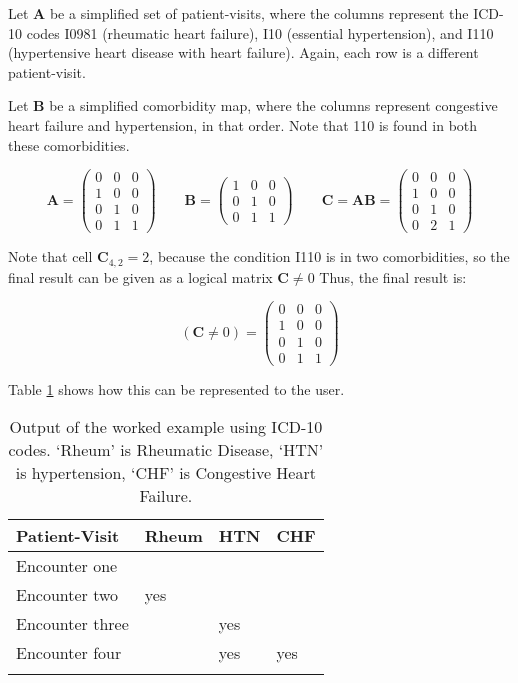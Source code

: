 \documentclass[article]{jss}
\begin{document}
Let \(\boldsymbol{A}\) be a simplified set of patient-visits, where the
columns represent the ICD-10 codes I0981 (rheumatic heart failure), I10
(essential hypertension), and I110 (hypertensive heart disease with
heart failure). Again, each row is a different patient-visit.

Let \(\boldsymbol{B}\) be a simplified comorbidity map, where the
columns represent congestive heart failure and hypertension, in that
order. Note that 110 is found in both these comorbidities.

\[\boldsymbol{A} =
\begin{pmatrix}
0 & 0 & 0 \\
1 & 0 & 0 \\
0 & 1 & 0 \\
0 & 1 & 1
\end{pmatrix}
\qquad
\boldsymbol{B} =
\begin{pmatrix}
1 & 0 & 0 \\
0 & 1 & 0 \\
0 & 1 & 1
\end{pmatrix}
\qquad
\boldsymbol{C} = \boldsymbol{A}\boldsymbol{B} =
\begin{pmatrix}
0 & 0 & 0 \\
1 & 0 & 0 \\
0 & 1 & 0 \\
0 & 2 & 1
\end{pmatrix}\]\label{eq:ABC}

Note that cell \(\boldsymbol{C}_{4,2} = 2\), because the condition I110
is in two comorbidities, so the final result can be given as a logical
matrix \(\boldsymbol{C} \neq 0\) Thus, the final result is:

\[(\boldsymbol{C} \neq 0) =
\begin{pmatrix}
0 & 0 & 0 \\
1 & 0 & 0 \\
0 & 1 & 0 \\
0 & 1 & 1
\end{pmatrix}\]\label{eq:Clogical}

Table \ref{tab:cmbresult} shows how this can be represented to the user.

\begin{longtable}{l|l|l|l}
\hline
Patient-Visit & Rheum & HTN & CHF\\
\hline
Encounter one &  &  & \\
\hline
Encounter two & yes &  & \\
\hline
Encounter three &  & yes & \\
\hline
Encounter four &  & yes & yes\\
\hline
\caption{\label{tab:cmbresult}Output of the worked example using ICD-10 codes. `Rheum' is Rheumatic Disease, `HTN' is hypertension, `CHF' is Congestive Heart Failure.}\\
\end{longtable}
\end{document}
